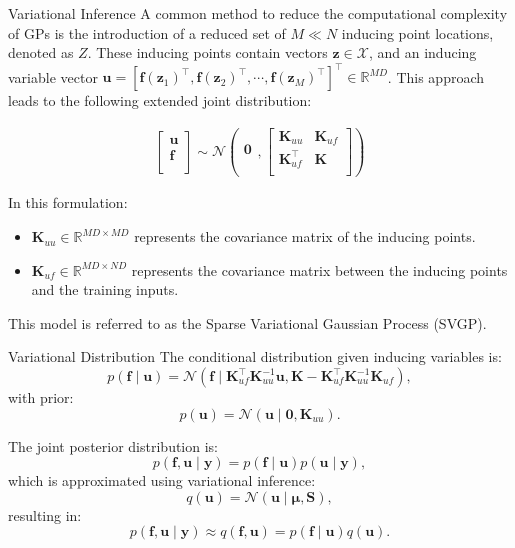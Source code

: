 \begin{frame}{Variational Inference}
	\justifying
	A common method to reduce the computational complexity of GPs is the introduction of a reduced set of $M \ll N$ inducing point locations, denoted as $Z$. These inducing points contain vectors $\mathbf{z} \in \mathcal{X}$, and an inducing variable vector $\mathbf{u} = [\bm{f}(\bm{z}_1)^\top, \bm{f}(\bm{z}_2)^\top, \cdots, \bm{f}(\bm{z}_{M})^\top]^\top \in \mathbb{R}^{M D}$. This approach leads to the following extended joint distribution:
	
	\[
	\begin{array}{rcl}
		\left[ \begin{array}{c}
			\mathbf{u}\\
			\mathbf{f}\\
		\end{array}
		\right]
		\sim
		\mathcal{N} \left(
		\begin{array}{c}
			\mathbf{0}\\
		\end{array},
		\left[ \begin{array}{cc}
			\mathbf{K}_{uu} & \mathbf{K}_{uf}\\
			\mathbf{K}_{uf}^\top & \mathbf{K}\\
		\end{array}
		\right] \right)
	\end{array}
	\]
	
	\justifying
	In this formulation:
	\begin{itemize}
		\item $\mathbf{K}_{uu} \in \mathbb{R}^{MD \times MD}$ represents the covariance matrix of the inducing points.
		\item $\mathbf{K}_{uf} \in \mathbb{R}^{MD \times ND}$ represents the covariance matrix between the inducing points and the training inputs.
	\end{itemize}
	
	This model is referred to as the Sparse Variational Gaussian Process (SVGP).
	
\end{frame}


\begin{frame}{Variational Distribution}
	The conditional distribution given inducing variables is:
	\[
	p(\mathbf{f} \mid \mathbf{u}) = \mathcal{N}\left( \mathbf{f} \mid \mathbf{K}_{uf}^\top \mathbf{K}_{uu}^{-1} \mathbf{u}, \mathbf{K} - \mathbf{K}_{uf}^\top \mathbf{K}_{uu}^{-1} \mathbf{K}_{uf}\right),
	\]
	with prior:
	\[
	p(\mathbf{u}) = \mathcal{N}(\mathbf{u} \mid \mathbf{0}, \mathbf{K}_{uu}).
	\]
	
	The joint posterior distribution is:
	\[
	p(\mathbf{f}, \mathbf{u} \mid \mathbf{y}) = p(\mathbf{f} \mid \mathbf{u}) p(\mathbf{u} \mid \mathbf{y}),
	\]
	which is approximated using variational inference:
	\[
	q(\mathbf{u}) = \mathcal{N}\left( \mathbf{u} \mid \boldsymbol{\mu}, \boldsymbol{S} \right),
	\]
	resulting in:
	\[
	p(\mathbf{f}, \mathbf{u} \mid \mathbf{y}) \approx q(\mathbf{f}, \mathbf{u}) = p(\mathbf{f} \mid \mathbf{u}) q(\mathbf{u}).
	\]
\end{frame}

